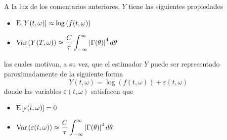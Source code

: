 A la luz de los comentarios anteriores, $Y$ tiene las siguientes propiedades
\begin{itemize}
\item $\displaystyle 
\mathrm{E}\left[  Y(t,\omega)  \right] \approx \log \left( f(t,\omega) \right)$
\item $\displaystyle 
\mathrm{Var}\left(  Y(T,\omega)  \right) 
\approx \frac{C}{\tau} \int_{-\infty}^{\infty} \left| \Gamma (\theta) \right|^{4} d\theta $
\end{itemize}
las cuales motivan, a su vez, que el estimador $Y$ puede ser representado paroximadamente de la
siguiente forma
\begin{equation*}
Y(t,\omega) = \log \left( f(t,\omega) \right) + \varepsilon(t,\omega)
\end{equation*}
donde las variables $\varepsilon(t,\omega)$ satisfacen que
\begin{itemize}
\item $\displaystyle \mathrm{E}\left[ \varepsilon(t,\omega) \right] = 0$
\item $\displaystyle \mathrm{Var}\left( \varepsilon(t,\omega) \right)
\approx \frac{C}{\tau} \int_{-\infty}^{\infty} \left| \Gamma (\theta) \right|^{4} d\theta$
\end{itemize}




